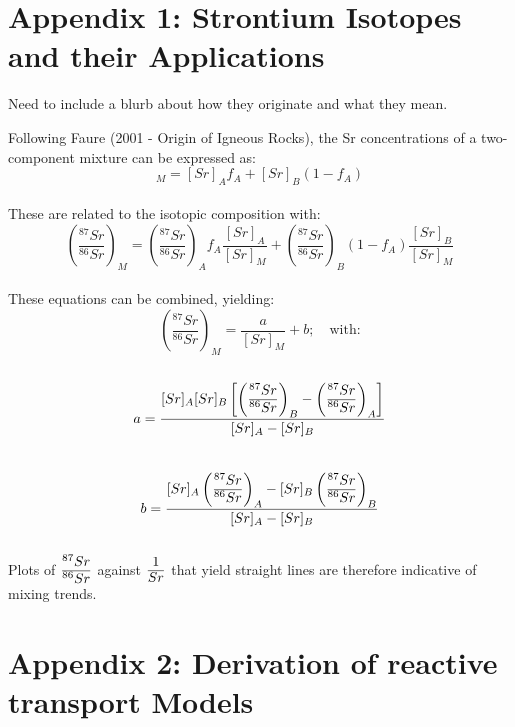 \section{Appendix 1: Strontium Isotopes and their Applications}
Need to include a blurb about how they originate and what they mean.

\bsk

Following Faure (2001 - Origin of Igneous Rocks), the Sr concentrations of a two-component mixture can be expressed as:\\

\begin{equation}
    [Sr]_M = [Sr]_A f_A + [Sr]_B(1-f_A)
\end{equation}\\

These are related to the isotopic composition with:\\

\begin{equation}
    \left(\frac{^{87}Sr}{^{86}Sr}\right)_M = \left(\frac{^{87}Sr}{^{86}Sr}\right)_A f_A \frac{[Sr]_A}{[Sr]_M} + \left(\frac{^{87}Sr}{^{86}Sr}\right)_B(1-f_A)\frac{[Sr]_B}{[Sr]_M} 
\end{equation}\\

These equations can be combined, yielding:\\

\begin{equation}
    \left(\frac{^{87}Sr}{^{86}Sr}\right)_M = \frac{a}{[Sr]_M} + b; \quad \text{with:}
\end{equation}\\
\begin{equation}
    a = \frac{[Sr]_A [Sr]_B \left[ \left( \ddfrac{^{87}Sr}{^{86}Sr} \right)_B - \left( \ddfrac{^{87}Sr}{^{86}Sr} \right)_A \right]}{[Sr]_A - [Sr]_B}
\end{equation}\\
\begin{equation}
    b = \frac{[Sr]_A \left( \ddfrac{^{87}Sr}{^{86}Sr} \right)_A - [Sr]_B \left( \ddfrac{^{87}Sr}{^{86}Sr} \right)_B}{[Sr]_A - [Sr]_B}
\end{equation}\\

Plots of $\ddfrac{^{87}Sr}{^{86}Sr}$ against $\ddfrac{1}{Sr}$ that yield straight lines are therefore indicative of mixing trends. 



\section{Appendix 2: Derivation of reactive transport Models}


